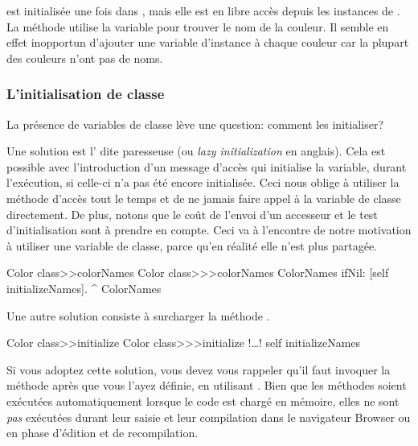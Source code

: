\documentclass[a4paper,10pt,twoside]{book}
\begin{document}

 est initialis\'ee une fois dans , mais elle est en libre acc\`es depuis les instances de .
La m\'ethode  utilise la variable pour trouver
le nom de la couleur.
Il semble en effet inopportun d'ajouter une variable d'instance 
\`a chaque couleur car la plupart des couleurs n'ont pas de noms.
 
\subsubsection{L'initialisation de classe}

La pr\'esence de variables de classe l\`eve une question: comment les initialiser?

Une solution est l' dite paresseuse (ou \emph{lazy initialization} en anglais).
Cela est possible avec l'introduction d'un message d'acc\`es qui
initialise la variable, durant l'ex\'ecution, si celle-ci n'a pas \'et\'e
encore initialis\'ee.
Ceci nous oblige \`a utiliser la m\'ethode d'acc\`es tout le temps et de ne jamais
faire appel \`a la variable de classe directement.
De plus, notons que le co\^ut de l'envoi d'un accesseur et le test d'initialisation sont \`a prendre en compte.
Ceci va \`a l'encontre de notre motivation \`a utiliser une variable de classe, parce qu'en r\'ealit\'e elle n'est plus partag\'ee.

\begin{method}[colorclasscolornames]{Color class>>colorNames}
Color class>>>colorNames	
	ColorNames ifNil: [self initializeNames].
	^ ColorNames
\end{method}	

Une autre solution consiste \`a surcharger la m\'ethode .

\begin{method}[colorclassinit]{Color class>>initialize}
Color class>>>initialize	
	!\ldots!
	self initializeNames
\end{method}

\noindent
Si vous adoptez cette solution, vous devez vous rappeler qu'il faut
invoquer la m\'ethode  apr\`es que vous l'ayez d\'efinie,
\eg en utilisant .
Bien que les m\'ethodes   soient ex\'ecut\'ees automatiquement lorsque le code est charg\'e en m\'emoire,
elles ne sont \emph{pas} ex\'ecut\'ees durant leur saisie et leur compilation dans le navigateur Browser ou en phase d'\'edition et de recompilation.
\end{document}
